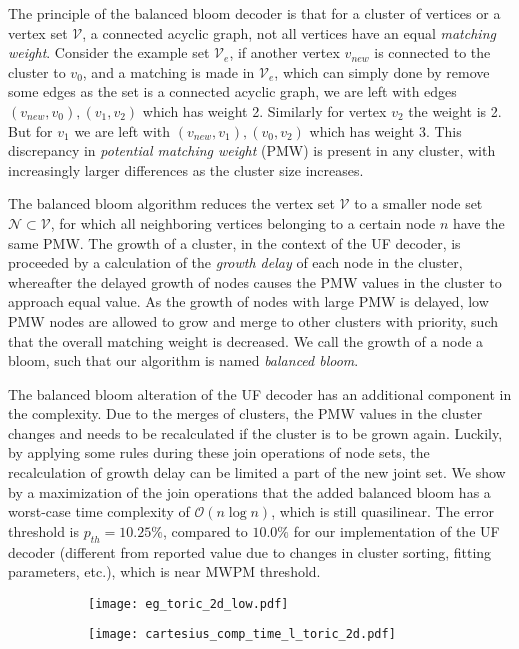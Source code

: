 \documentclass[11pt, a4paper, twoside, titlepage, usenames,dvipsnames]{report}
\begin{document}
The principle of the balanced bloom decoder is that for a cluster of vertices or a vertex set $\mathcal{V}$, a connected acyclic graph, not all vertices have an equal \emph{matching weight}. Consider the example set $\mathcal{V}_e$, if another vertex $v_{new}$ is connected to the cluster to $v_0$, and a matching is made in $\mathcal{V}_e$, which can simply done by remove some edges as the set is a connected acyclic graph, we are left with edges $(v_{new}, v_0), (v_1, v_2)$ which has weight 2. Similarly for vertex $v_2$ the weight is 2. But for $v_1$ we are left with $(v_{new}, v_1), (v_0, v_2)$ which has weight 3. This discrepancy in \emph{potential matching weight} (PMW) is present in any cluster, with increasingly larger differences as the cluster size increases.

The balanced bloom algorithm reduces the vertex set $\mathcal{V}$ to a smaller node set $\mathcal{N} \subset \mathcal{V}$, for which all neighboring vertices belonging to a certain node $n$ have the same PMW. The growth of a cluster, in the context of the UF decoder, is proceeded by a calculation of the \emph{growth delay} of each node in the cluster, whereafter the delayed growth of nodes causes the PMW values in the cluster to approach equal value. As the growth of nodes with large PMW is delayed, low PMW nodes are allowed to grow and merge to other clusters with priority, such that the overall matching weight is decreased. We call the growth of a node a bloom, such that our algorithm is named \emph{balanced bloom}.

The balanced bloom alteration of the UF decoder has an additional component in the complexity. Due to the merges of clusters, the PMW values in the cluster changes and needs to be recalculated if the cluster is to be grown again. Luckily, by applying some rules during these join operations of node sets, the recalculation of growth delay can be limited a part of the new joint set. We show by a maximization of the join operations that the added balanced bloom has a worst-case time complexity of $\mathcal{O}(n \log n)$, which is still quasilinear. The error threshold is $p_{th} = 10.25\%$, compared to $10.0\%$ for our implementation of the UF decoder (different from reported value due to changes in cluster sorting, fitting parameters, etc.), which is near MWPM threshold. 

\begin{figure}
     \centering
     \begin{subfigure}[b]{0.45\textwidth}
         \centering
         \texttt{[image: eg\_toric\_2d\_low.pdf]}
     \end{subfigure}
     \hfill
     \begin{subfigure}[b]{0.45\textwidth}
         \centering
         \texttt{[image: cartesius\_comp\_time\_l\_toric\_2d.pdf]}
     \end{subfigure}
\end{figure}
\end{document}
